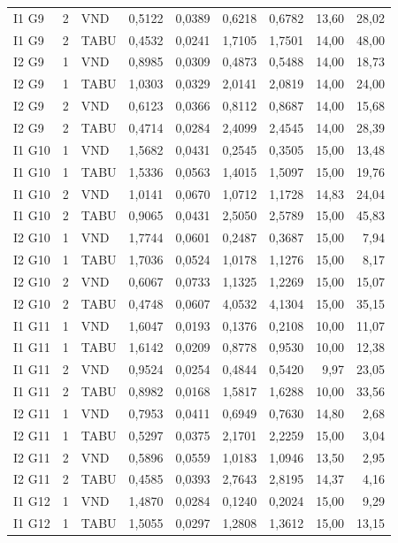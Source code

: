 \begin{longtable}{lrlrrrrrr}
I1 G9 & 2 & VND & 0,5122 & 0,0389 & 0,6218 & 0,6782 & 13,60 & 28,02 \\
I1 G9 & 2 & TABU & 0,4532 & 0,0241 & 1,7105 & 1,7501 & 14,00 & 48,00 \\
I2 G9 & 1 & VND & 0,8985 & 0,0309 & 0,4873 & 0,5488 & 14,00 & 18,73 \\
I2 G9 & 1 & TABU & 1,0303 & 0,0329 & 2,0141 & 2,0819 & 14,00 & 24,00 \\
I2 G9 & 2 & VND & 0,6123 & 0,0366 & 0,8112 & 0,8687 & 14,00 & 15,68 \\
I2 G9 & 2 & TABU & 0,4714 & 0,0284 & 2,4099 & 2,4545 & 14,00 & 28,39 \\
I1 G10 & 1 & VND & 1,5682 & 0,0431 & 0,2545 & 0,3505 & 15,00 & 13,48 \\
I1 G10 & 1 & TABU & 1,5336 & 0,0563 & 1,4015 & 1,5097 & 15,00 & 19,76 \\
I1 G10 & 2 & VND & 1,0141 & 0,0670 & 1,0712 & 1,1728 & 14,83 & 24,04 \\
I1 G10 & 2 & TABU & 0,9065 & 0,0431 & 2,5050 & 2,5789 & 15,00 & 45,83 \\
I2 G10 & 1 & VND & 1,7744 & 0,0601 & 0,2487 & 0,3687 & 15,00 & 7,94 \\
I2 G10 & 1 & TABU & 1,7036 & 0,0524 & 1,0178 & 1,1276 & 15,00 & 8,17 \\
I2 G10 & 2 & VND & 0,6067 & 0,0733 & 1,1325 & 1,2269 & 15,00 & 15,07 \\
I2 G10 & 2 & TABU & 0,4748 & 0,0607 & 4,0532 & 4,1304 & 15,00 & 35,15 \\
I1 G11 & 1 & VND & 1,6047 & 0,0193 & 0,1376 & 0,2108 & 10,00 & 11,07 \\
I1 G11 & 1 & TABU & 1,6142 & 0,0209 & 0,8778 & 0,9530 & 10,00 & 12,38 \\
I1 G11 & 2 & VND & 0,9524 & 0,0254 & 0,4844 & 0,5420 & 9,97 & 23,05 \\
I1 G11 & 2 & TABU & 0,8982 & 0,0168 & 1,5817 & 1,6288 & 10,00 & 33,56 \\
I2 G11 & 1 & VND & 0,7953 & 0,0411 & 0,6949 & 0,7630 & 14,80 & 2,68 \\
I2 G11 & 1 & TABU & 0,5297 & 0,0375 & 2,1701 & 2,2259 & 15,00 & 3,04 \\
I2 G11 & 2 & VND & 0,5896 & 0,0559 & 1,0183 & 1,0946 & 13,50 & 2,95 \\
I2 G11 & 2 & TABU & 0,4585 & 0,0393 & 2,7643 & 2,8195 & 14,37 & 4,16 \\
I1 G12 & 1 & VND & 1,4870 & 0,0284 & 0,1240 & 0,2024 & 15,00 & 9,29 \\
I1 G12 & 1 & TABU & 1,5055 & 0,0297 & 1,2808 & 1,3612 & 15,00 & 13,15 \\

\end{longtable}
